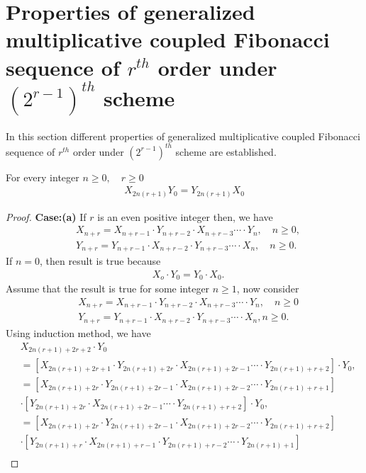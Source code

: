 \section{Properties of generalized multiplicative coupled Fibonacci  sequence of $r^{th}$ order under $(2^{r-1})^{th}$ scheme}
In this section different properties of generalized multiplicative coupled Fibonacci  sequence of $r^{th}$ order under $(2^{r-1})^{th}$ scheme are established.
\begin{theorem}For every integer $n\geq0, \quad r\geq0$
\begin{align}
X_{2n(r+1)} Y_{0}=Y_{2n(r+1)} X_{0}
\end{align}
\end{theorem}
\begin{proof}
\textbf{Case:(a)} If $r$ is an even positive integer then, we have
\begin{align*}
	&X_{n+r}=X_{n+r-1}\cdot Y_{n+r-2}\cdot X_{n+r-3}\cdots\cdot Y_{n},\quad n\geq 0,\\
	&Y_{n+r}=Y_{n+r-1}\cdot X_{n+r-2}\cdot Y_{n+r-3}\cdots\cdot X_{n}, \quad n\geq 0.
		\end{align*}
		If $n=0$, then result is true because
\begin{align*}
&X_{o}\cdot Y_{0}=Y_{0}\cdot X_{0}.
	\end{align*}
	Assume that the result is true for some integer $n\geq1$, now consider
\begin{align*}
	&	X_{n+r}=X_{n+r-1}\cdot Y_{n+r-2}\cdot X_{n+r-3}\cdots\cdot Y_{n},\quad n\geq 0\\
	&Y_{n+r}=Y_{n+r-1}\cdot X_{n+r-2}\cdot Y_{n+r-3}\cdots\cdot X_{n}, n\geq 0.
	\end{align*}
	Using induction method, we have
\begin{align*}
&X_{2n(r+1)+2r+2}\cdot Y_{0}\\&=\left[X_{2n(r+1)+2r+1}\cdot Y_{2n(r+1)+2r}\cdot X_{2n(r+1)+2r-1}\cdots\cdot Y_{2n(r+1)+r+2}\right]\cdot Y_{0},\\
&=\left[X_{2n(r+1)+2r}\cdot Y_{2n(r+1)+2r-1}\cdot X_{2n(r+1)+2r-2}\cdots\cdot Y_{2n(r+1)+r+1}\right]\\
&\cdot\left[Y_{2n(r+1)+2r}\cdot X_{2n(r+1)+2r-1}\cdots\cdot Y_{2n(r+1)+r+2}\right]\cdot Y_{0},\\
&=\left[X_{2n(r+1)+2r}\cdot Y_{2n(r+1)+2r-1}\cdot X_{2n(r+1)+2r-2}\cdots\cdot Y_{2n(r+1)+r+2}\right]\\
&\cdot\left[Y_{2n(r+1)+r}\cdot X_{2n(r+1)+r-1}\cdot Y_{2n(r+1)+r-2}\cdots\cdot Y_{2n(r+1)+1}\right]\\

\end{align*}
\end{proof}
